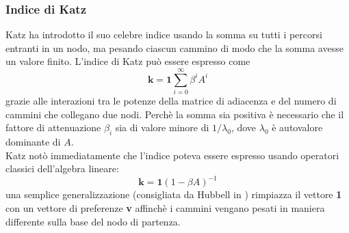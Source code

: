 \subsubsection{Indice di Katz}
Katz ha introdotto il suo celebre indice %
usando la somma su tutti i percorsi entranti in un nodo, ma pesando ciascun cammino di modo che la somma avesse un valore finito. L'indice di Katz può essere espresso come
\begin{equation}
    \textbf{k} = \textbf{1} \sum_{i = 0}^{\infty}{\beta^i A^i}
\end{equation}
grazie alle interazioni tra le potenze della matrice di adiacenza e del numero di cammini che collegano due nodi. Perchè la somma sia positiva è necessario che il fattore di attenuazione $\beta_i$ sia di valore minore di $1 / \lambda_0$, dove $\lambda_0$ è autovalore dominante di $A$.\\
Katz notò immediatamente che l'indice poteva essere espresso usando operatori classici dell'algebra lineare:
\begin{equation}
    \textbf{k} = \textbf{1}(1 - \beta A)^{-1}
\end{equation}
una semplice generalizzazione (consigliata da Hubbell in %
) rimpiazza il vettore \textbf{1} con un vettore di preferenze \textbf{v} affinchè i cammini vengano pesati in maniera differente sulla base del nodo di partenza.
